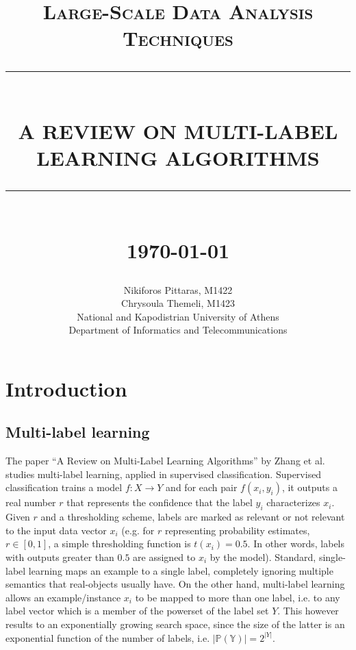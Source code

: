 \documentclass[12pt]{report}
\newcommand{\HRule}[1]{\rule{\linewidth}{#1}}
\begin{document}
	
	\title{ \normalsize \textsc{Large-Scale Data Analysis Techniques}
		\\ [2.0cm]
		\HRule{0.5pt} \\
		\LARGE \textbf{\uppercase{A Review on Multi-Label Learning Algorithms}}
		\HRule{2pt} \\ [0.5cm]
		\normalsize \today \vspace*{5\baselineskip}}
	
	\date{}
	\author{
		Nikiforos Pittaras, M1422\\
		Chrysoula Themeli, M1423 \\ 
		National and Kapodistrian University of Athens\\
		Department of Informatics and Telecommunications }
	
	\maketitle
	\tableofcontents
	\listoffigures
	\newpage
	
	\sectionfont{\scshape}
	
	
	\section*{Introduction}
	
	\subsection*{Multi-label learning}
	The paper ``A Review on Multi-Label Learning Algorithms'' by Zhang et al.
  studies multi-label learning, applied in supervised classification. Supervised
  classification trains a model $f: X \rightarrow Y$ and for each pair
  $f(x_i,y_i)$, it outputs a real number $r$ that represents the confidence that
  the label $y_i$ characterizes $x_i$. Given $r$ and a thresholding scheme, labels
  are marked as relevant or not relevant to the input data vector $x_i$ (e.g.
  for $r$ representing probability estimates, $r \in [0,1]$, a simple
  thresholding function is $t(x_i) = 0.5$. In other words, labels with outputs
  greater than $0.5$ are assigned to $x_i$ by the model). Standard, single-label learning maps an
  example to a single label, completely ignoring multiple semantics that
  real-objects usually have. On the other hand, multi-label learning allows an
  example/instance $x_i$ to be mapped to more than one label, i.e. to any label
  vector which is a member of the powerset of the label set $Y$. This however
  results to an exponentially growing search space,
  since the size of the latter is an exponential function of the number of labels, i.e. $|\mathbb{P(Y)}| = 2^{|Y|}$.
	
\end{document}
